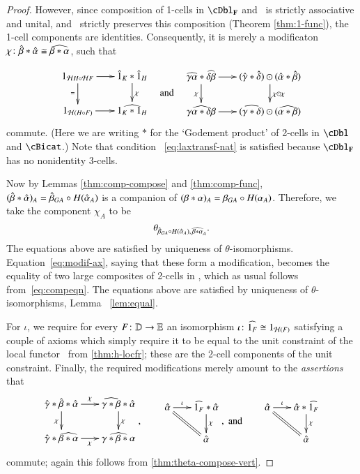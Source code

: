 \documentclass{amsart}
\begin{document}
\begin{proof}
However, since composition of
  1-cells in $\cDbl_{\bf F}$ and \cBicat\ is strictly associative and
  unital, and \cH\ strictly preserves this composition (Theorem \ref{thm:1-func}),
  the 1-cell components are identities. Consequently, it is merely  a modificaton $\chi\colon \hat{\beta} * \hat{\alpha} \cong \widehat{\beta*\alpha}$, such that 
 
 \begin{equation}
        \vcenter{\xymatrix@-.5pc{
        1_{{\cH}H \circ {\cH}F} \ar[r]\ar[d]_{=} &
        \hat{1}_{K}*\hat{1}_{H}\ar[d]^{\chi}\\
        1_{{\cH}(H \circ F)}\ar[r] &
        \widehat{1_{K} *1_{H}}}} \quad\text{and}\quad       
    \vcenter{\xymatrix@-.5pc{
        \widehat{\gm\al}*\widehat{\de\be} \ar[r]\ar[d]_\chi &
        (\gmhat*\dehat)\odot(\alhat*\behat)\ar[d]^{\chi \odot \chi}\\
        \widehat{\gm\al*\de\be}\ar[r] &
        (\widehat{\gm*\de})\odot(\widehat{\al*\be})}}
  \end{equation}
commute. (Here we are writing $*$ for the `Godement product' of 2-cells in $\cDbl$ and $\cBicat$.)    
Note that condition ~\ref{eq:laxtransf-nat} is satisfied because $\cDbl_{\bf F}$ has no nonidentity 3-cells.
  
  Now by Lemmas \ref{thm:comp-compose} and
  \ref{thm:comp-func}, $(\hat{\beta} *\hat{\alpha})_A = \hat{\beta}_{GA} \circ
  H(\hat{\alpha}_A)$ is a companion of $(\beta*\alpha)_A = \beta_{GA} \circ
  H(\alpha_A)$.  Therefore, we take the component $\chi_A$ to be
  \[\theta_{\hat{\beta}_{GA} \circ H(\hat{\alpha}_A),\, \widehat{\beta*\alpha}_A}.\]
  The equations above are satisfied by uniqueness of $\theta$-isomorphisms.
   Equation~\eqref{eq:modif-ax}, saying that these form a modification,
  becomes the equality of two large composites of 2-cells in \lD,
  which as usual follows from~\eqref{eq:compeqn}. The equations above are satisfied by uniqueness of $\theta$-isomorphisms, Lemma ~\ref{lem:equal}.

  For $\iota$, we require for every $F\colon \mathbb{D}\to\mathbb{E}$ an isomorphism  $\iota\colon \widehat{1_F} \cong 1_{\mathcal{H}(F)}$ satisfying a couple of
  axioms which simply require it to be equal to the unit constraint of
  the local functor \cH\ from \autoref{thm:h-locfr}; these are the
  2-cell components of the unit constraint.  Finally, the required
  modifications merely amount to the \emph{assertions} that
  \[\vcenter{\xymatrix@-.5pc{\gmhat*\behat*\alhat \ar[r]^\chi\ar[d]_\chi &
      \widehat{\gm*\be}*\alhat \ar[d]^\chi\\
      \gmhat*\widehat{\be*\al}\ar[r]_\chi & \widehat{\gm*\be*\al}}},\qquad
  \vcenter{\xymatrix@-.5pc{ \alhat \ar[r]^-\iota \ar@{=}[dr] &
      \widehat{1_F}*\alhat \ar[d]^\chi \\ & \alhat }}, \;\text{and}\qquad
  \vcenter{\xymatrix@-.5pc{ \alhat \ar[r]^-\iota \ar@{=}[dr] &
      \alhat*\widehat{1_F} \ar[d]^\chi \\ & \alhat }}\]
  commute; again this follows from \autoref{thm:theta-compose-vert}.
\end{proof}
\end{document}
